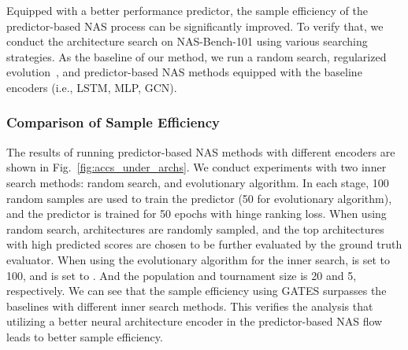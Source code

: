 \documentclass[runningheads]{llncs}
\begin{document}
Equipped with a better performance predictor, the sample efficiency of the predictor-based NAS process can be significantly improved. To verify that, we conduct the architecture search on NAS-Bench-101 using various searching strategies. As the baseline of our method, 
we run a random search, regularized evolution~\cite{real2019regularized},
and predictor-based NAS methods equipped with the baseline encoders (i.e., LSTM, MLP, GCN).



\begin{figure*}[bt]
\caption{Comparison of predictor-based NAS with different encoders: The best validation accuracy during the search process over 10/15 runs for the RS and EA inner serach method, respectively.  is the sample ratio (see Sec.~\ref{sec:method-nas})}
\label{fig:accs_under_archs}
\end{figure*}


\begin{figure*}[tb]
\caption{Left: Number of architectures evaluated to acquire the best validation accuracy on NAS-Bench-101 over 100 runs. We use the mean validation accuracy as the search reward. GATES-powered predictor-based NAS is 511.0 and 59.25 more sample efficient than random search and regularized evolution. Right: 
  Number of architectures evaluated to acquire the best validation accuracy over 10 runs with different }
\label{fig:box_ablation}
\end{figure*}


\subsubsection{Comparison of Sample Efficiency}
The results of running predictor-based NAS methods with different encoders are shown in Fig.~\ref{fig:accs_under_archs}. We conduct experiments with two inner search methods: random search, and evolutionary algorithm. 
In each stage, 100 random samples are used to train the predictor (50 for evolutionary algorithm), and the predictor is trained for 50 epochs with hinge ranking loss. When using random search,  architectures are randomly sampled, and the top  architectures with high predicted scores are chosen to be further evaluated by the ground truth evaluator. When using the evolutionary algorithm for the inner search,  is set to 100, and  is set to . And the population and tournament size is 20 and 5, respectively. 
We can see that the sample efficiency using GATES surpasses the baselines with different inner search methods. This verifies the analysis that utilizing a better neural architecture encoder in the predictor-based NAS flow leads to better sample efficiency.
\end{document}
